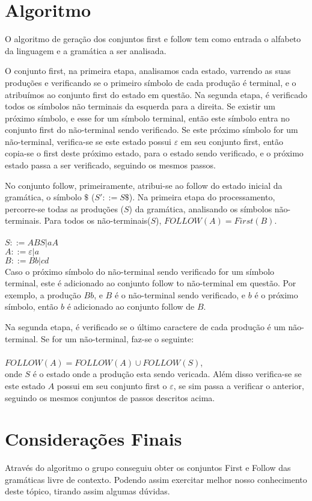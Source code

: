 \documentclass[10pt,a4paper,titlepage]{hitec}
\begin{document}
\section*{Algoritmo}

O algoritmo de geração dos conjuntos first e follow tem como entrada o alfabeto da linguagem e a gramática a ser analisada.

O conjunto first, na primeira etapa, analisamos cada estado, varrendo as suas produções e verificando se o primeiro símbolo de cada produção é terminal, e o atribuímos ao conjunto first do estado em questão. Na segunda etapa, é verificado todos os símbolos não terminais da esquerda para a direita. Se existir um próximo símbolo, e esse for um símbolo terminal, então este símbolo entra no conjunto first do não-terminal sendo verificado. Se este próximo símbolo for um não-terminal, verifica-se se este estado possui $\varepsilon$ em seu conjunto first, então copia-se o first deste próximo estado, para o estado sendo verificado, e o próximo estado passa a ser verificado, seguindo os mesmos passos.

No conjunto follow, primeiramente, atribui-se ao follow do estado inicial da gramática, o símbolo $\$$ ($S' ::= S\$$).
Na primeira etapa do processamento, percorre-se todas as produções ($S$) da gramática, analisando os símbolos não-terminais. Para todos os não-terminais($S$), $FOLLOW(A) = First(B)$.
\\
\\
$S ::= ABS |aA $\\
$A ::= \varepsilon | a$\\
$B ::= Bb | cd$\\

Caso o próximo símbolo do não-terminal sendo verificado for um símbolo terminal, este é adicionado ao conjunto follow to não-terminal em questão.
Por exemplo, a produção $Bb$, e $B$ é o não-terminal sendo verificado, e $b$ é o próximo símbolo, então $b$ é adicionado ao conjunto follow de $B$.

Na segunda etapa, é verificado se o último caractere de cada produção é um não-terminal. Se for um não-terminal, faz-se o seguinte:\\
\\
$FOLLOW(A) = FOLLOW(A) \cup FOLLOW(S)$,\\

onde $S$ é o estado onde a produção esta sendo vericada.
Além disso verifica-se se este estado $A$ possui em seu conjunto first o $\varepsilon$, se sim passa a verificar o anterior, seguindo os mesmos conjuntos de passos descritos acima.

\section*{Considerações Finais}

Através do algoritmo o grupo conseguiu obter os conjuntos First e Follow das gramáticas livre de contexto. 
Podendo assim exercitar melhor nosso conhecimento deste tópico, tirando assim algumas dúvidas. 
\end{document}
